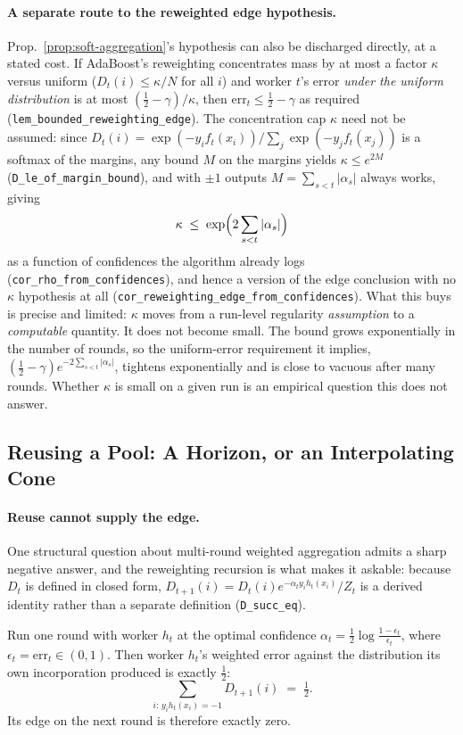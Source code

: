 \paragraph{A separate route to the reweighted edge hypothesis.} Prop.~\ref{prop:soft-aggregation}'s hypothesis can also be discharged directly, at a stated cost. If AdaBoost's reweighting concentrates mass by at most a factor $\kappa$ versus uniform ($D_t(i)\le\kappa/N$ for all $i$) and worker $t$'s error \emph{under the uniform distribution} is at most $(\tfrac12-\gamma)/\kappa$, then $\mathrm{err}_t\le\tfrac12-\gamma$ as required (\texttt{lem\_bounded\_reweighting\_edge}). The concentration cap $\kappa$ need not be assumed: since $D_t(i)=\exp(-y_if_t(x_i))/\sum_j\exp(-y_jf_t(x_j))$ is a softmax of the margins, any bound $M$ on the margins yields $\kappa\le e^{2M}$ (\texttt{D\_le\_of\_margin\_bound}), and with $\pm1$ outputs $M=\sum_{s<t}|\alpha_s|$ always works, giving
\[
\kappa \;\le\; \exp\Bigl(2\sum_{s<t}|\alpha_s|\Bigr)
\]
as a function of confidences the algorithm already logs (\texttt{cor\_rho\_from\_confidences}), and hence a version of the edge conclusion with no $\kappa$ hypothesis at all (\texttt{cor\_reweighting\_edge\_from\_confidences}). What this buys is precise and limited: $\kappa$ moves from a run-level regularity \emph{assumption} to a \emph{computable} quantity. It does not become small. The bound grows exponentially in the number of rounds, so the uniform-error requirement it implies, $(\tfrac12-\gamma)e^{-2\sum_{s<t}|\alpha_s|}$, tightens exponentially and is close to vacuous after many rounds. Whether $\kappa$ is small on a given run is an empirical question this does not answer.


\subsection{Reusing a Pool: A Horizon, or an Interpolating Cone}

\paragraph{Reuse cannot supply the edge.} One structural question about multi-round weighted aggregation admits a sharp negative answer, and the reweighting recursion is what makes it askable: because $D_t$ is defined in closed form, $D_{t+1}(i)=D_t(i)e^{-\alpha_t y_ih_t(x_i)}/Z_t$ is a derived identity rather than a separate definition (\texttt{D\_succ\_eq}).

\begin{proposition}
\label{prop:self-reuse}
Run one round with worker $h_t$ at the optimal confidence $\alpha_t=\tfrac12\log\frac{1-\epsilon_t}{\epsilon_t}$, where $\epsilon_t=\mathrm{err}_t\in(0,1)$. Then worker $h_t$'s weighted error against the distribution its own incorporation produced is exactly $\tfrac12$:
\[
\sum_{i:\,y_ih_t(x_i)=-1} D_{t+1}(i) \;=\; \tfrac12 .
\]
Its edge on the next round is therefore exactly zero.
\end{proposition}

